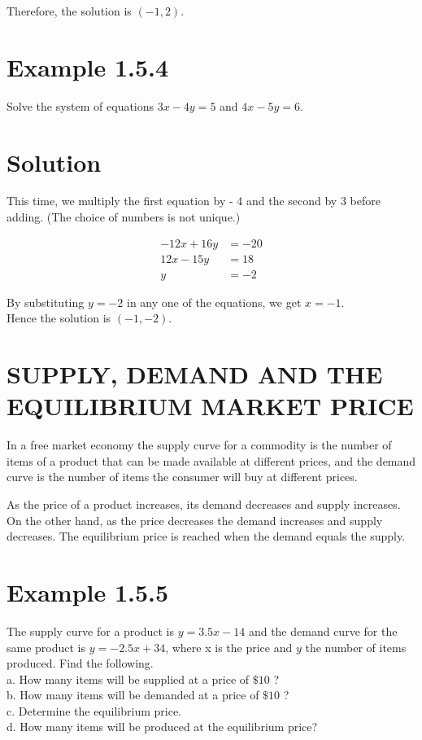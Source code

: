 Therefore, the solution is $(-1,2)$.

\section*{Example 1.5.4}
Solve the system of equations $3 x-4 y=5$ and $4 x-5 y=6$.

\section*{Solution}
This time, we multiply the first equation by - 4 and the second by 3 before adding. (The choice of numbers is not unique.)

$$
\begin{aligned}
-12 x+16 y & =-20 \\
12 x-15 y & =18 \\
\hline y & =-2
\end{aligned}
$$

By substituting $y=-2$ in any one of the equations, we get $x=-1$.\\
Hence the solution is $(-1,-2)$.

\section*{SUPPLY, DEMAND AND THE EQUILIBRIUM MARKET PRICE}
In a free market economy the supply curve for a commodity is the number of items of a product that can be made available at different prices, and the demand curve is the number of items the consumer will buy at different prices.

As the price of a product increases, its demand decreases and supply increases. On the other hand, as the price decreases the demand increases and supply decreases. The equilibrium price is reached when the demand equals the supply.

\section*{Example 1.5.5}
The supply curve for a product is $y=3.5 x-14$ and the demand curve for the same product is $y=-2.5 x+34$, where x is the price and $y$ the number of items produced. Find the following.\\
a. How many items will be supplied at a price of $\$ 10$ ?\\
b. How many items will be demanded at a price of $\$ 10$ ?\\
c. Determine the equilibrium price.\\
d. How many items will be produced at the equilibrium price?

